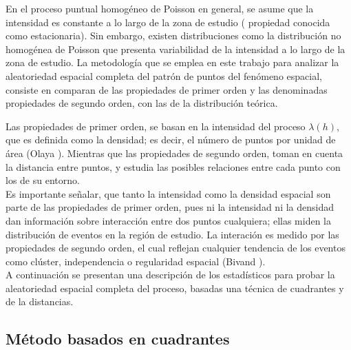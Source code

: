 \documentclass[12pt]{report}
\begin{document}
		
		En el proceso puntual homogéneo de Poisson en general, se asume que la intensidad es constante a lo largo de la zona de estudio ( propiedad conocida como estacionaria). Sin embargo, existen distribuciones como la distribución no homogénea de Poisson que presenta variabilidad de la intensidad a lo largo de la zona de estudio.  La metodología que se emplea en este trabajo para analizar la aleatoriedad espacial completa  del patrón  de puntos del fenómeno espacial, consiste  en  comparan de  las propiedades de primer orden  y las denominadas propiedades de segundo orden, con las de la distribución teórica.		
		
		Las propiedades de primer orden, se basan en la intensidad del proceso $\lambda(h)$, que es definida como la densidad; es decir, el número de puntos por unidad de área (Olaya \cite{Olaya}).   Mientras que las propiedades de segundo orden, toman en cuenta la distancia entre puntos, y estudia las posibles relaciones entre cada punto con los de su entorno.  \\
		
		Es importante señalar, que tanto la intensidad como la densidad espacial son parte de las propiedades de primer orden, pues ni la intensidad ni la densidad dan información sobre interacción entre dos puntos cualquiera; ellas miden la distribución de eventos en la región de estudio. La interación es medido por las propiedades de segundo orden, el cual reflejan cualquier tendencia de los eventos como clúster, independencia o regularidad espacial  (Bivand  \cite{Roger}).  \\
		
		
		A continuación se presentan una descripción de los estadísticos  para probar la aleatoriedad espacial completa del proceso, basadas una técnica de cuadrantes y  de la distancias.
			
	
		\subsection{Método basados en cuadrantes}\label{MCuadrantes}
		
\end{document}
